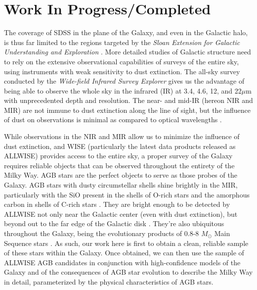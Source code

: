 
\section{Work In Progress/Completed}
\label{sec:completedWork}
The coverage of SDSS in the plane of the Galaxy, and even in the Galactic halo, is thus far limited to the regions targeted by the \emph{Sloan Extension for Galactic Understanding and Exploration} \citep[SEGUE;][]{2012ApJ...757..166B}. More detailed studies of Galactic structure need to rely on the extensive observational capabilities of surveys of the entire sky, using instruments with weak sensitivity to dust extinction. The all-sky survey conducted by the \emph{Wide-field Infrared Survey Explorer} \citep[WISE;][]{2010AJ....140.1868W, 2012wise.rept....1C} gives us the advantage of being able to observe the whole sky in the infrared (IR) at 3.4, 4.6, 12, and 22$\mu$m with unprecedented depth and resolution. The near- and mid-IR (hereon NIR and MIR) are not immune to dust extinction along the line of sight, but the influence of dust on observations is minimal as compared to optical wavelengths \citep{2012ApJ...757..166B, 2014MNRAS.440.3430D}. 

While observations in the NIR and MIR allow us to minimize the influence of dust extinction, and  WISE (particularly the latest data products released as ALLWISE) provides access to the entire sky, a proper survey of the Galaxy requires reliable objects that can be observed throughout the entirety of the Milky Way. AGB stars are the perfect objects to serve as those probes of the Galaxy. AGB stars with dusty circumstellar shells shine brightly in the MIR, particularly with the SiO present in the shells of O-rich stars and the amorphous carbon in shells of C-rich stars \citep{2011A&A...534A..79I}. They are bright enough to be detected by ALLWISE not only near the Galactic center (even with dust extinction), but beyond out to the far edge of the Galactic disk \citep{2013RAA....13..323T}. They're also ubiquitous throughout the Galaxy, being the evolutionary products of 0.8-8 $M_\odot$ Main Sequence stars \citep{1983ARA&A..21..271I}. As such, our work here is first to obtain a clean, reliable sample of these stars within the Galaxy. Once obtained, we can then use the sample of ALLWISE AGB candidates in conjunction with high-confidence models of the Galaxy and of the consequences of AGB star evolution to describe the Milky Way in detail, parameterized by the physical characteristics of AGB stars.

